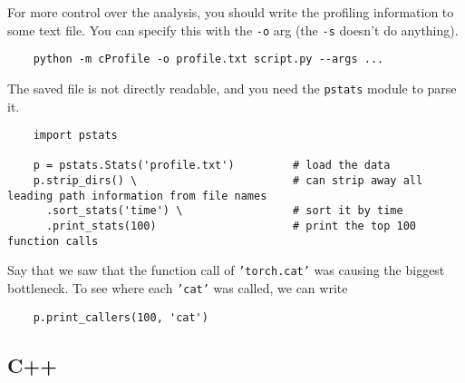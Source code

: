   For more control over the analysis, you should write the profiling information to some text file. You can specify this with the \texttt{-o} arg (the \texttt{-s} doesn't do anything). 
  \begin{lstlisting}
    python -m cProfile -o profile.txt script.py --args ... 
  \end{lstlisting}
  The saved file is not directly readable, and you need the \texttt{pstats} module to parse it. 
  \begin{lstlisting}
    import pstats

    p = pstats.Stats('profile.txt')         # load the data
    p.strip_dirs() \                        # can strip away all leading path information from file names
      .sort_stats('time') \                 # sort it by time 
      .print_stats(100)                     # print the top 100 function calls 
  \end{lstlisting}  

  Say that we saw that the function call of \texttt{'torch.cat'} was causing the biggest bottleneck. To see where each \texttt{'cat'} was called, we can write 
  \begin{lstlisting}
    p.print_callers(100, 'cat')
  \end{lstlisting} 

\subsection{C++}
